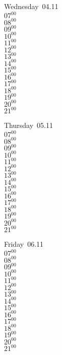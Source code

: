 \documentclass[11pt,a4paper]{book}\usepackage[]{graphicx}\usepackage[]{color}
\begin{document}
\begin{weekdaybox}
  Wednesday~04.11\\
  { 
  \vfill
  $07^{00}$\\
$08^{00}$\\
$09^{00}$\\
$10^{00}$\\
$11^{00}$\\
$12^{00}$\\
$13^{00}$\\
$14^{00}$\\
$15^{00}$\\
$16^{00}$\\
$17^{00}$\\
$18^{00}$\\
$19^{00}$\\
$20^{00}$\\
$21^{00}$\\
  }
\end{weekdaybox}
\clearpage
\begin{headerbox}
\end{headerbox}
\begin{weekdaybox}
  Thursday~05.11\\
  { 
  \vfill
  $07^{00}$\\
$08^{00}$\\
$09^{00}$\\
$10^{00}$\\
$11^{00}$\\
$12^{00}$\\
$13^{00}$\\
$14^{00}$\\
$15^{00}$\\
$16^{00}$\\
$17^{00}$\\
$18^{00}$\\
$19^{00}$\\
$20^{00}$\\
$21^{00}$\\
  }
\end{weekdaybox} 
\begin{weekdaybox}
  Friday~06.11\\
  { 
  \vfill
  $07^{00}$\\
$08^{00}$\\
$09^{00}$\\
$10^{00}$\\
$11^{00}$\\
$12^{00}$\\
$13^{00}$\\
$14^{00}$\\
$15^{00}$\\
$16^{00}$\\
$17^{00}$\\
$18^{00}$\\
$19^{00}$\\
$20^{00}$\\
$21^{00}$\\
  }
\end{weekdaybox}
\end{document}
